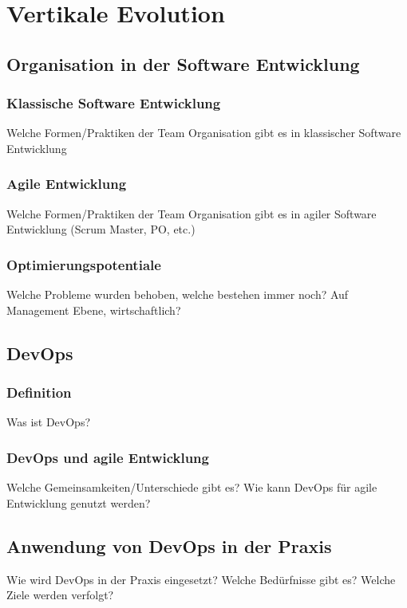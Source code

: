 \chapter{Vertikale Evolution} %

\section{Organisation in der Software Entwicklung}

\subsection{Klassische Software Entwicklung}
Welche Formen/Praktiken der Team Organisation gibt es in klassischer Software Entwicklung

\subsection{Agile Entwicklung}
Welche Formen/Praktiken der Team Organisation gibt es in agiler Software Entwicklung (Scrum Master, PO, etc.)

\subsection{Optimierungspotentiale}
Welche Probleme wurden behoben, welche bestehen immer noch?
Auf Management Ebene, wirtschaftlich?

\section{DevOps}

\subsection{Definition}
Was ist DevOps?

\subsection{DevOps und agile Entwicklung}
Welche Gemeinsamkeiten/Unterschiede gibt es? Wie kann DevOps für agile Entwicklung genutzt werden?

\section{Anwendung von DevOps in der Praxis}
Wie wird DevOps in der Praxis eingesetzt?
Welche Bedürfnisse gibt es? Welche Ziele werden verfolgt?

